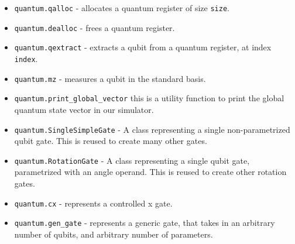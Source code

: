 \begin{itemize}
    \item \texttt{quantum.qalloc} - allocates a quantum register of size
          \texttt{size}.
    \item \texttt{quantum.dealloc} - frees a quantum register.
    \item \texttt{quantum.qextract} - extracts a qubit from a quantum register,
          at index \texttt{index}.
    \item \texttt{quantum.mz} - measures a qubit in the standard basis.
    \item \texttt{quantum.print\_global\_vector} this is a utility function to
          print the global quantum state vector in our simulator.
    \item \texttt{quantum.SingleSimpleGate} - A class representing a single
          non-parametrized qubit gate. This is reused to create many other gates.
    \item \texttt{quantum.RotationGate} - A class representing a single qubit
          gate, parametrized with an angle operand. This is reused to create other
          rotation gates.
    \item \texttt{quantum.cx} - represents a controlled x gate.
    \item \texttt{quantum.gen\_gate} - represents a generic gate, that takes in
          an arbitrary number of qubits, and arbitrary number of parameters.
\end{itemize}
